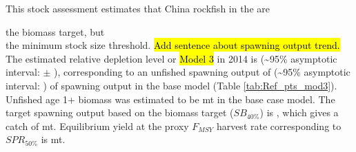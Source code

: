 \documentclass[12pt,]{article}
\begin{document}
This stock assessment estimates that China rockfish in the are

the biomass target, but\\
the minimum stock size threshold.
\hl{Add sentence about spawning output trend.} The estimated relative
depletion level or \hl{Model 3} in 2014 is (\textasciitilde{}95\%
asymptotic interval: \(\pm\) ), corresponding to an unfished spawning
output of (\textasciitilde{}95\% asymptotic interval: ) of spawning
output in the base model (Table \ref{tab:Ref_pts_mod3}). Unfished age 1+
biomass was estimated to be mt in the base case model. The target
spawning output based on the biomass target (\(SB_{40\%}\)) is , which
gives a catch of mt. Equilibrium yield at the proxy \(F_{MSY}\) harvest
rate corresponding to \(SPR_{50\%}\) is mt.

\FloatBarrier
\end{document}
